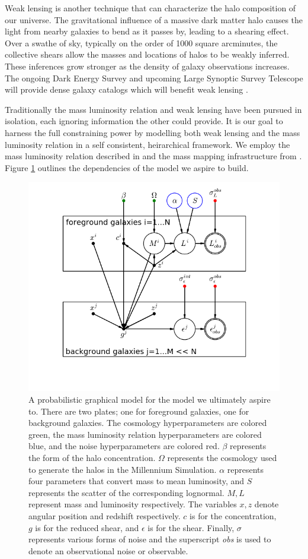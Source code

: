 \documentclass[\docopts]{\docclass}
\begin{document}
Weak lensing is another technique that can characterize the halo composition of our universe. 
The gravitational influence of a massive dark matter halo causes the light from nearby galaxies to bend as it passes by, leading to a shearing effect. 
Over a swathe of sky, typically on the order of 1000 square arcminutes, the collective shears allow the masses and locations of halos to be weakly inferred. 
These inferences grow stronger as the density of galaxy observations increases.
The ongoing Dark Energy Survey and upcoming Large Synoptic Survey Telescope will provide dense galaxy catalogs which will benefit weak lensing \citep{des, lsst}. 

Traditionally the mass luminosity relation and weak lensing have been pursued in isolation, each ignoring information the other could provide. 
It is our goal to harness the full constraining power by modelling both weak lensing and the mass luminosity relation in a self consistent, heirarchical framework.
We employ the mass luminosity relation described in \citet{reddick} and the mass mapping infrastructure from 
\citet{components}. 
Figure \ref{fig:ultimate_pgm} outlines the dependencies of the model we aspire to build.

\begin{figure}[h]
\centering
\includegraphics[width=0.9\columnwidth]{ultimate_pgm.png}
\caption{
A probabilistic graphical model for the model we ultimately aspire to. 
There are two plates; one for foreground galaxies, one for background galaxies. 
The cosmology hyperparameters are colored green, the mass luminosity relation hyperparameters are colored blue, and the noise hyperparameters are colored red. 
$\beta$ represents the form of the halo concentration.
$\Omega$ represents the cosmology used to generate the halos in the Millennium Simulation.
$\alpha$ represents four parameters that convert mass to mean luminosity, and $S$ represents the scatter of the corresponding lognormal.
$M,L$ represent mass and luminosity respectively. 
The variables $x,z$ denote angular position and redshift respectively.
$c$ is for the concentration, $g$ is for the reduced shear, and $\epsilon$ is for the shear.
Finally, $\sigma$ represents various forms of noise and the superscript \emph{obs} is used to denote an observational noise or observable. 
\label{fig:ultimate_pgm}}
\end{figure}
\end{document}
